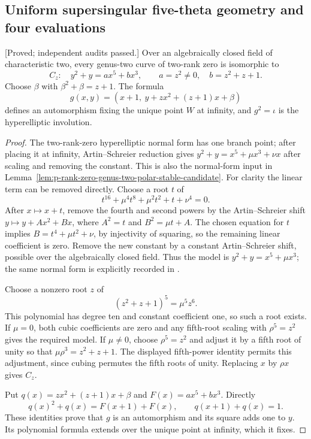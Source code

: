 \subsection{Uniform supersingular five-theta geometry and four evaluations}
\label{subsec:uniform-five-theta-geometry-candidate}

\begin{lemma}
\label{lem:uniform-f0-order-four-presentation-candidate}
\textup{[Proved; independent audits passed.]}
Over an algebraically closed field of characteristic two, every genus-two
curve of two-rank zero is isomorphic to
\[
 C_z:\quad y^2+y=a x^5+b x^3,\qquad
 a=z^2\ne0,\quad b=z^2+z+1.
\]
Choose $\beta$ with $\beta^2+\beta=z+1$. The formula
\[
       g(x,y)=(x+1,\ y+z x^2+(z+1)x+\beta)
\]
defines an automorphism fixing the unique point $W$ at infinity,
and $g^2=\iota$ is the hyperelliptic involution.
\end{lemma}
\begin{proof}
The two-rank-zero hyperelliptic normal form has one branch point;
after placing it at infinity, Artin--Schreier reduction gives
$y^2+y=x^5+\mu x^3+\nu x$ after scaling and removing the constant.
This is also the normal-form input in
Lemma~\ref{lem:p-rank-zero-genus-two-polar-stable-candidate}.
For clarity the linear term can be removed directly. Choose a root
$t$ of
\[
                 t^{16}+\mu^4t^8+\mu^2t^2+t+\nu^4=0.
\]
After $x\mapsto x+t$, remove the fourth and second powers by the
Artin--Schreier shift $y\mapsto y+A x^2+B x$, where
$A^2=t$ and $B^2=\mu t+A$. The chosen equation for $t$ implies
$B=t^4+\mu t^2+\nu$, by injectivity of squaring, so the remaining
linear coefficient is zero. Remove the new constant by a constant
Artin--Schreier shift, possible over the algebraically closed field.
Thus the model is
$y^2+y=x^5+\mu x^3$; the same normal form is explicitly recorded in
\cite[pp.~30--31]{BoxallGrantLeprevost2001}.

Choose a nonzero root $z$ of
\[
                       (z^2+z+1)^5=\mu^5z^6.
\]
This polynomial has degree ten and constant coefficient one, so such
a root exists. If $\mu=0$, both cubic coefficients are zero and any
fifth-root scaling with $\rho^5=z^2$ gives the required model.
If $\mu\ne0$, choose $\rho^5=z^2$ and adjust it by a fifth root of
unity so that $\mu\rho^3=z^2+z+1$. The displayed fifth-power
identity permits this adjustment, since cubing permutes the fifth
roots of unity. Replacing $x$ by $\rho x$ gives $C_z$.

Put $q(x)=z x^2+(z+1)x+\beta$ and $F(x)=a x^5+b x^3$.
Directly
\[
       q(x)^2+q(x)=F(x+1)+F(x),\qquad q(x+1)+q(x)=1.
\]
These identities prove that $g$ is an automorphism and its square
adds one to $y$. Its polynomial formula extends over the unique
point at infinity, which it fixes.
\end{proof}

